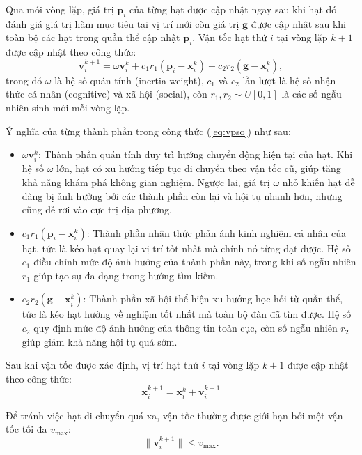 Qua mỗi vòng lặp, giá trị $\mathbf{p}_i$ của từng hạt được cập nhật ngay sau khi hạt đó đánh giá giá trị hàm mục tiêu tại vị trí mới còn giá trị $\mathbf{g}$ được cập nhật sau khi toàn bộ các hạt trong quần thể cập nhật $\mathbf{p}_i$. Vận tốc hạt thứ \(i\) tại vòng lặp \(k+1\) được cập nhật theo công thức:
\begin{equation}
    \mathbf{v}_i^{k+1} = \omega \mathbf{v}_i^{k} + c_1 r_1 (\mathbf{p}_i - \mathbf{x}_i^{k}) + c_2 r_2 (\mathbf{g} - \mathbf{x}_i^{k}),
\label{eq:vpso}
\end{equation}
trong đó $\omega$ là hệ số quán tính (inertia weight), $c_1$ và $c_2$ lần lượt là hệ số nhận thức cá nhân (cognitive) và xã hội (social), còn $r_1, r_2 \sim U[0,1]$ là các số ngẫu nhiên sinh mới mỗi vòng lặp.

Ý nghĩa của từng thành phần trong công thức (\ref{eq:vpso}) như sau:
\begin{itemize}
    \item \(\omega \mathbf{v}_i^k\): Thành phần quán tính duy trì hướng chuyển động hiện tại của hạt. Khi hệ số \(\omega\) lớn, hạt có xu hướng tiếp tục di chuyển theo vận tốc cũ, giúp tăng khả năng khám phá không gian nghiệm. Ngược lại, giá trị \(\omega\) nhỏ khiến hạt dễ dàng bị ảnh hưởng bởi các thành phần còn lại và hội tụ nhanh hơn, nhưng cũng dễ rơi vào cực trị địa phương.
    \item \(c_1 r_1 (\mathbf{p}_i - \mathbf{x}_i^{k})\): Thành phần nhận thức phản ánh kinh nghiệm cá nhân của hạt, tức là kéo hạt quay lại vị trí tốt nhất mà chính nó từng đạt được. Hệ số \(c_1\) điều chỉnh mức độ ảnh hưởng của thành phần này, trong khi số ngẫu nhiên \(r_1\) giúp tạo sự đa dạng trong hướng tìm kiếm.
    \item \(c_2 r_2 (\mathbf{g} - \mathbf{x}_i^{k})\): Thành phần xã hội thể hiện xu hướng học hỏi từ quần thể, tức là kéo hạt hướng về nghiệm tốt nhất mà toàn bộ đàn đã tìm được. Hệ số \(c_2\) quy định mức độ ảnh hưởng của thông tin toàn cục, còn số ngẫu nhiên \(r_2\) giúp giảm khả năng hội tụ quá sớm.
\end{itemize}

Sau khi vận tốc được xác định, vị trí hạt thứ \(i\) tại vòng lặp \(k+1\) được cập nhật theo công thức:
\begin{equation}
    \mathbf{x}_i^{k+1} = \mathbf{x}_i^{k} + \mathbf{v}_i^{k+1}
\label{eq:ppso}
\end{equation}

Để tránh việc hạt di chuyển quá xa, vận tốc thường được giới hạn bởi một vận tốc tối đa $v_{\max}$:
\begin{equation}
    \|\mathbf{v}_i^{k+1}\| \le v_{\max}.
\label{eq:lmppso}
\end{equation}




